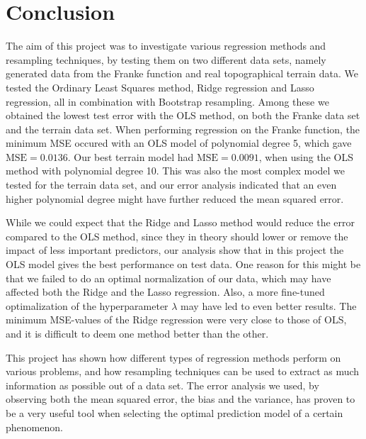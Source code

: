 \section{Conclusion}\label{sec:Conclusion}

The aim of this project was to investigate various regression methods and resampling techniques, by testing them on two different data sets, namely generated data from the Franke function and real topographical terrain data. We tested the Ordinary Least Squares method, Ridge regression and Lasso regression, all in combination with Bootstrap resampling. Among these we obtained the lowest test error with the OLS method, on both the Franke data set and the terrain data set. When performing regression on the Franke function, the minimum MSE occured with an OLS model of polynomial degree 5, which gave $\text{MSE} = 0.0136$. Our best terrain model had $\text{MSE} = 0.0091$, when using the OLS method with polynomial degree 10. This was also the most complex model we tested for the terrain data set, and our error analysis indicated that an even higher polynomial degree might have further reduced the mean squared error.

While we could expect that the Ridge and Lasso method would reduce the error compared to the OLS method, since they in theory should lower or remove the impact of less important predictors, our analysis show that in this project the OLS model gives the best performance on test data. One reason for this might be that we failed to do an optimal normalization of our data, which may have affected both the Ridge and the Lasso regression. Also, a more fine-tuned optimalization of the hyperparameter $\lambda$ may have led to even better results. The minimum MSE-values of the Ridge regression were very close to those of OLS, and it is difficult to deem one method better than the other.

This project has shown how different types of regression methods perform on various problems, and how resampling techniques can be used to extract as much information as possible out of a data set. The error analysis we used, by observing both the mean squared error, the bias and the variance, has proven to be a very useful tool when selecting the optimal prediction model of a certain phenomenon.



